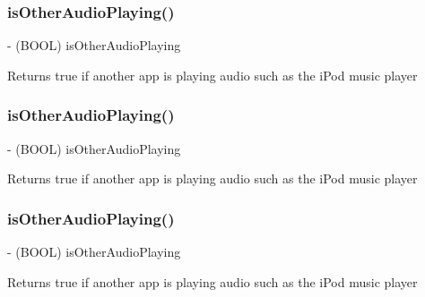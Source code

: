 \subsubsection{\texorpdfstring{is\+Other\+Audio\+Playing()}{isOtherAudioPlaying()}\hspace{0.1cm}{\footnotesize\ttfamily [1/4]}}
{\footnotesize\ttfamily -\/ (B\+O\+OL) is\+Other\+Audio\+Playing \begin{DoxyParamCaption}{ }\end{DoxyParamCaption}}

Returns true if another app is playing audio such as the i\+Pod music player \mbox{\label{interfaceCDAudioManager_ab664b34e99f6f3e2158f2df910cf3a95}} 
\subsubsection{\texorpdfstring{is\+Other\+Audio\+Playing()}{isOtherAudioPlaying()}\hspace{0.1cm}{\footnotesize\ttfamily [2/4]}}
{\footnotesize\ttfamily -\/ (B\+O\+OL) is\+Other\+Audio\+Playing \begin{DoxyParamCaption}{ }\end{DoxyParamCaption}}

Returns true if another app is playing audio such as the i\+Pod music player \mbox{\label{interfaceCDAudioManager_ab664b34e99f6f3e2158f2df910cf3a95}} 
\subsubsection{\texorpdfstring{is\+Other\+Audio\+Playing()}{isOtherAudioPlaying()}\hspace{0.1cm}{\footnotesize\ttfamily [3/4]}}
{\footnotesize\ttfamily -\/ (B\+O\+OL) is\+Other\+Audio\+Playing \begin{DoxyParamCaption}{ }\end{DoxyParamCaption}}

Returns true if another app is playing audio such as the i\+Pod music player \mbox{\label{interfaceCDAudioManager_ab664b34e99f6f3e2158f2df910cf3a95}} 
